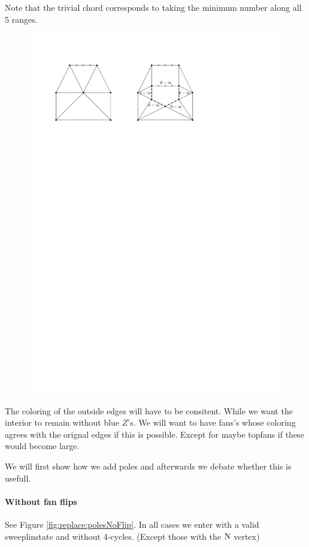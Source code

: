 Note that the trivial chord corresponds to taking the minimum number along all 5 ranges.
\begin{figure}[h]
  \centering
  \includegraphics[scale=1]{chordReplace/img/unshrunk}
  \caption{}
  \label{fig:replace:unshrunk}
\end{figure}


 The coloring of the outside edges will have to be consitent. While we want the interior to remain without blue $Z$'s. We will want to have fans's whose coloring agrees with the orignal edges if this is possible. Except for maybe topfans if these would become large.



We will first show how we add poles and afterwards we debate whether this is usefull.

\paragraph{Without fan flips}
See Figure \ref{fig:replace:polesNoFlip}. In all cases we enter with a valid sweeplinstate and without 4-cycles. (Except those with the $\mathrm{N}$ vertex)

